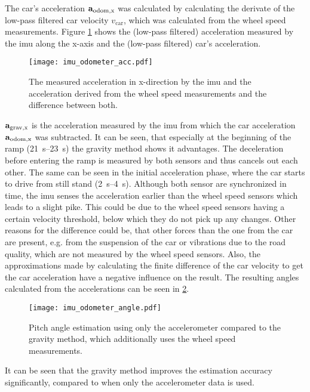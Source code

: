 The car's acceleration $\vb{a}_\mathrm{odom,x} $ was calculated by calculating the derivate of the low-pass filtered car velocity $v_\mathrm{car} $, which was calculated from the wheel speed measurements.
Figure \ref{fig:imu_odometer_acc} shows the (low-pass filtered) acceleration measured by the \gls{imu} along the x-axis and the (low-pass filtered) car's acceleration.
\begin{figure}[htb]
	\centering
	\texttt{[image: imu\_odometer\_acc.pdf]}
	\caption[Acceleration from  and odometer]{The measured acceleration in x-direction by the \gls{imu} and the acceleration derived from the wheel speed measurements and the difference between both.}
	\label{fig:imu_odometer_acc}
\end{figure}
$\vb{a}_\mathrm{grav,x} $ is the acceleration measured by the \gls{imu} from which the car acceleration $\vb{a}_\mathrm{odom,x} $ was subtracted.
It can be seen, that especially at the beginning of the ramp (\SIrange{21}{23}{\second}) the gravity method shows it advantages.
The deceleration before entering the ramp is measured by both sensors and thus cancels out each other.
The same can be seen in the initial acceleration phase, where the car starts to drive from still stand (\SIrange[]{2}{4}{\second}).
Although both sensor are synchronized in time, the \gls{imu} senses the acceleration earlier than the wheel speed sensors which leads to a slight pike.
This could be due to the wheel speed sensors having a certain velocity threshold, below which they do not pick up any changes.
Other reasons for the difference could be, that other forces than the one from the car are present, e.g. from the suspension of the car or vibrations due to the road quality, which are not measured by the wheel speed sensors.
Also, the approximations made by calculating the finite difference of the car velocity to get the car acceleration have a negative influence on the result.
The resulting angles calculated from the accelerations can be seen in \cref{fig:imu_odometer_angle}.
\begin{figure}[htb]
	\centering
	\texttt{[image: imu\_odometer\_angle.pdf]}
	\caption[Angle estimation using the gravity method]{Pitch angle estimation using only the accelerometer compared to the gravity method, which additionally uses the wheel speed measurements.}
	\label{fig:imu_odometer_angle}
\end{figure}
It can be seen that the gravity method improves the estimation accuracy significantly, compared to when only the accelerometer data is used.
